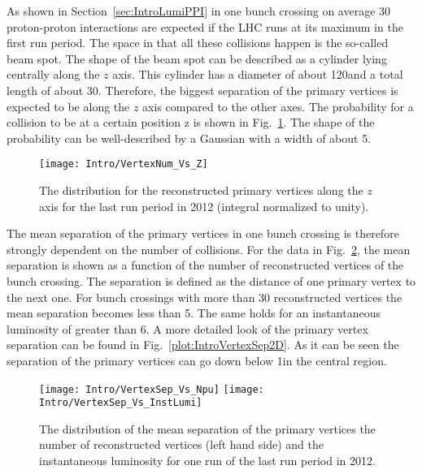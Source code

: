As shown in Section~\ref{sec:IntroLumiPPI} in one bunch crossing on average 30 proton-proton interactions are expected if the LHC runs at its maximum in the first run period. The space in that all these collisions happen is the so-called beam spot. The shape of the beam spot can be described as a cylinder lying centrally along the $z$ axis. This cylinder has a diameter of about 120\mum and a total length of about 30\cm. Therefore, the biggest separation of the primary vertices is expected to be along the $z$ axis compared to the other axes. The probability for a collision to be at a certain position z is shown in Fig.~\ref{plot:IntroVertexPos}. The shape of the probability can be well-described by a Gaussian with a width of about 5\cm.

\begin{figure}[Htb]
    \centering
    \texttt{[image: Intro/VertexNum\_Vs\_Z]}
    \caption[Vertex distribution along z]{The distribution for the reconstructed primary vertices along the $z$ axis for the last run period in 2012 (integral normalized to unity). \label{plot:IntroVertexPos}}
\end{figure}

The mean separation of the primary vertices in one bunch crossing is therefore strongly dependent on the number of collisions. For the data in Fig.~\ref{plot:IntroVertexSep}, the mean separation is shown as a function of the number of reconstructed vertices of the bunch crossing. The separation is defined as the distance of one primary vertex to the next one. For bunch crossings with more than 30 reconstructed vertices the mean separation becomes less than 5\mm. The same holds for an instantaneous luminosity of greater than 6\hertzpernbarn. A more detailed look of the primary vertex separation can be found in Fig.~\ref{plot:IntroVertexSep2D}. As it can be seen the separation of the primary vertices can go down below 1\mm in the central region.

\begin{figure}[Htb]
    \centering
    \texttt{[image: Intro/VertexSep\_Vs\_Npu]}
    \texttt{[image: Intro/VertexSep\_Vs\_InstLumi]}
    \caption[Mean vertex separation \vs number of reconstructed vertices and \vs instantaneous luminosity]{The distribution of the mean separation of the primary vertices \vs the number of reconstructed vertices (left hand side) and \vs the instantaneous luminosity for one run of the last run period in 2012. \label{plot:IntroVertexSep}}
\end{figure}

